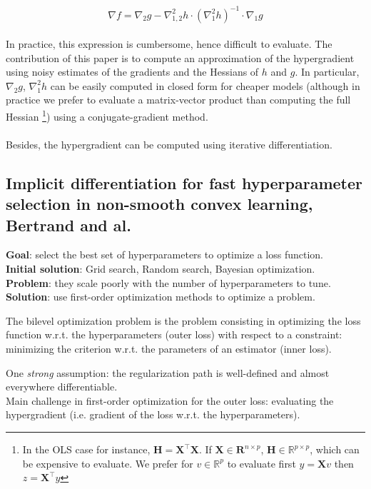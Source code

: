 \documentclass[a4paper,10pt]{article}
\theoremstyle{definition}
\begin{document}
\begin{equation*}
    \nabla f = \nabla_2 g - \nabla^2_{1,2}h \cdot (\nabla_1^2 h)^{-1} \cdot \nabla_1 g
\end{equation*}
\\
In practice, this expression is cumbersome, hence difficult to evaluate. The contribution of this paper is to compute an approximation of the hypergradient using noisy estimates
of the gradients and the Hessians of $h$ and $g$. In particular, $\nabla_2 g$, $\nabla^2_1 h$ can be
easily computed in closed form for cheaper models (although in practice we prefer to evaluate
a matrix-vector product than computing the full Hessian \footnote{In the OLS case for instance, $\mathbf{H} = \mathbf{X^\top X}$. If $\mathbf{X} \in \mathbf{R}^{n \times p}$,
$\mathbf{H} \in \mathbb{R}^{p \times p}$, which can be expensive to evaluate. We prefer for $v \in \mathbb{R}^{p}$ to evaluate
first $y=\mathbf{X}v$ then $z=\mathbf{X^\top}y$}) using a conjugate-gradient method.
\\
\\
Besides, the hypergradient can be computed using iterative differentiation.

\subsection{Implicit differentiation for fast hyperparameter selection in non-smooth convex learning, Bertrand and al.}

\textbf{Goal}: select the best set of hyperparameters to optimize a loss function. \\
\textbf{Initial solution}: Grid search, Random search, Bayesian optimization. \\
\textbf{Problem}: they scale poorly with the number of hyperparameters to tune. \\
\textbf{Solution}: use first-order optimization methods to optimize a problem. \\

\vskip 0.1in

The bilevel optimization problem is the problem consisting in optimizing the loss function w.r.t. the hyperparameters (outer loss)
with respect to a constraint: minimizing the criterion w.r.t. the parameters  of an estimator (inner loss).

\vskip 0.1in

One \textit{strong} assumption: the regularization path is well-defined and almost everywhere differentiable.\\
Main challenge in first-order optimization for the outer loss: evaluating the hypergradient (i.e. gradient of the loss w.r.t. the hyperparameters).
\end{document}
